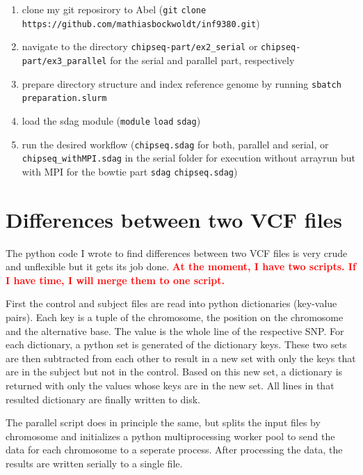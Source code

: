 \documentclass[paper=a4, 12pt]{scrartcl}
\newcommand{\xxx}[1]{\textbf{\textcolor{red}{#1}}}	%
\begin{document}
\begin{enumerate}
\item clone my git reposirory to Abel (\texttt{git} \texttt{clone} \texttt{https://}\allowbreak\texttt{github.com/}\allowbreak\texttt{mathiasbockwoldt/}\allowbreak\texttt{inf9380.git})
\item navigate to the directory \texttt{chipseq-part/}\allowbreak\texttt{ex2\_serial} or \texttt{chipseq-part/}\allowbreak\texttt{ex3\_parallel} for the serial and parallel part, respectively
\item prepare directory structure and index reference genome by running \texttt{sbatch} \texttt{preparation.slurm}
\item load the sdag module (\texttt{module} \texttt{load} \texttt{sdag})
\item run the desired workflow (\texttt{chipseq.sdag} for both, parallel and serial, or \texttt{chipseq\_withMPI.sdag} in the serial folder for execution without arrayrun but with MPI for the bowtie part \texttt{sdag} \texttt{chipseq.sdag})
\end{enumerate}


\section{Differences between two VCF files}

The python code I wrote to find differences between two VCF files is very crude and unflexible but it gets its job done. \xxx{At the moment, I have two scripts. If I have time, I will merge them to one script.}

First the control and subject files are read into python dictionaries (key-value pairs). Each key is a tuple of the chromosome, the position on the chromosome and the alternative base. The value is the whole line of the respective SNP. For each dictionary, a python set is generated of the dictionary keys. These two sets are then subtracted from each other to result in a new set with only the keys that are in the subject but not in the control. Based on this new set, a dictionary is returned with only the values whose keys are in the new set. All lines in that resulted dictionary are finally written to disk.

The parallel script does in principle the same, but splits the input files by chromosome and initializes a python multiprocessing worker pool to send the data for each chromosome to a seperate process. After processing the data, the results are written serially to a single file.
\end{document}
